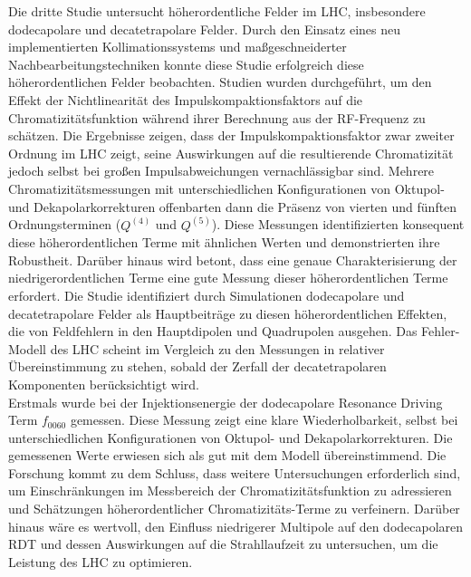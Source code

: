 {%
Die dritte Studie untersucht höherordentliche Felder im LHC, insbesondere dodecapolare und
decatetrapolare Felder. Durch den Einsatz eines neu implementierten Kollimationssystems und
maßgeschneiderter Nachbearbeitungstechniken konnte diese Studie erfolgreich diese höherordentlichen
Felder beobachten. Studien wurden durchgeführt, um den Effekt der Nichtlinearität des
Impulskompaktionsfaktors auf die Chromatizitätsfunktion während ihrer Berechnung aus der RF-Frequenz
zu schätzen. Die Ergebnisse zeigen, dass der Impulskompaktionsfaktor zwar zweiter Ordnung im LHC
zeigt, seine Auswirkungen auf die resultierende Chromatizität jedoch selbst bei großen
Impulsabweichungen vernachlässigbar sind. Mehrere Chromatizitätsmessungen mit unterschiedlichen
Konfigurationen von Oktupol- und Dekapolarkorrekturen offenbarten dann die Präsenz von vierten und
fünften Ordnungsterminen ($Q^{(4)}$ und $Q^{(5)}$). Diese Messungen identifizierten konsequent diese
höherordentlichen Terme mit ähnlichen Werten und demonstrierten ihre Robustheit. Darüber hinaus wird
betont, dass eine genaue Charakterisierung der niedrigerordentlichen Terme eine gute Messung dieser
höherordentlichen Terme erfordert. Die Studie identifiziert durch Simulationen dodecapolare und
decatetrapolare Felder als Hauptbeiträge zu diesen höherordentlichen Effekten, die von Feldfehlern
in den Hauptdipolen und Quadrupolen ausgehen. Das Fehler-Modell des LHC scheint im Vergleich zu den
Messungen in relativer Übereinstimmung zu stehen, sobald der Zerfall der decatetrapolaren
Komponenten berücksichtigt wird.\\
\indent
Erstmals wurde bei der Injektionsenergie der dodecapolare Resonance Driving Term $f_{0060}$
gemessen. Diese Messung zeigt eine klare Wiederholbarkeit, selbst bei unterschiedlichen
Konfigurationen von Oktupol- und Dekapolarkorrekturen. Die gemessenen Werte erwiesen sich als gut
mit dem Modell übereinstimmend. Die Forschung kommt zu dem Schluss, dass weitere Untersuchungen
erforderlich sind, um Einschränkungen im Messbereich der Chromatizitätsfunktion zu adressieren und
Schätzungen höherordentlicher Chromatizitäts-Terme zu verfeinern. Darüber hinaus wäre es wertvoll,
den Einfluss niedrigerer Multipole auf den dodecapolaren RDT und dessen Auswirkungen auf die
Strahllaufzeit zu untersuchen, um die Leistung des LHC zu optimieren.

}
